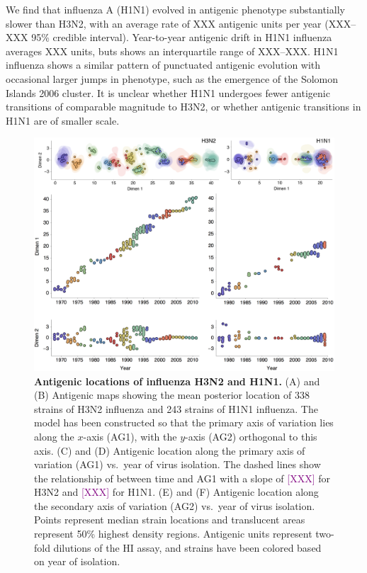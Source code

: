 \documentclass[11pt,oneside,letterpaper]{article}
\def\tbc#1{\textcolor{purple}{[#1]}}
\begin{document}
We find that influenza A (H1N1) evolved in antigenic phenotype substantially slower than H3N2, with an average rate of XXX antigenic units per year (XXX--XXX 95\% credible interval).  
Year-to-year antigenic drift in H1N1 influenza averages XXX units, buts shows an interquartile range of XXX--XXX.
H1N1 influenza shows a similar pattern of punctuated antigenic evolution with occasional larger jumps in phenotype, such as the emergence of the Solomon Islands 2006 cluster.  
It is unclear whether H1N1 undergoes fewer antigenic transitions of comparable magnitude to H3N2, or whether antigenic transitions in H1N1 are of smaller scale.

\begin{figure}[tb]
	\centering		
	\includegraphics[width=\textwidth]{figures/fluAGrid}
	\caption{\textbf{Antigenic locations of influenza H3N2 and H1N1.} (A) and (B) Antigenic maps showing the mean posterior location of 338 strains of H3N2 influenza and 243 strains of H1N1 influenza.  
	The model has been constructed so that the primary axis of variation lies along the $x$-axis (AG1), with the $y$-axis (AG2) orthogonal to this axis.  
	(C) and (D) Antigenic location along the primary axis of variation (AG1) vs.\ year of virus isolation.  
	The dashed lines show the relationship of between time and AG1 with a slope of \tbc{XXX} for H3N2 and \tbc{XXX} for H1N1.  
	(E) and (F) Antigenic location along the secondary axis of variation (AG2) vs.\ year of virus isolation.  
	Points represent median strain locations and translucent areas represent 50\% highest density regions.
	Antigenic units represent two-fold dilutions of the HI assay, and strains have been colored based on year of isolation.} 
	\label{fluAGrid} 
\end{figure}
\end{document}
